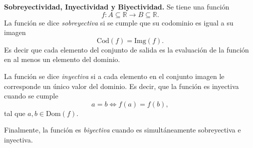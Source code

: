 \begin{definition}\textbf{Sobreyectividad, Inyectividad y Biyectividad.}
    Se tiene una función
    \begin{equation*}
        f: A \subseteq \mathbb{R} \rightarrow B \subseteq \mathbb{R}.
    \end{equation*}
    La función se dice \textit{sobreyectiva} si se cumple que su codominio es igual a su imagen
    \begin{equation*}
        \text{Cod}(f)=\text{Img}(f).
    \end{equation*}
    Es decir que cada elemento del conjunto de salida es la evaluación de la función en al menos un elemento del
    dominio.

    La función se dice \textit{inyectiva} si a cada elemento en el conjunto imagen le corresponde un único
    valor del dominio. Es decir, que la función es inyectiva cuando se cumple
    \begin{equation*}
        a=b \Leftrightarrow f(a)=f(b),
    \end{equation*}
    tal que $a,b\in \text{Dom}(f)$.

    Finalmente, la función es \textit{biyectiva} cuando es simultáneamente sobreyectiva e inyectiva.
\end{definition}